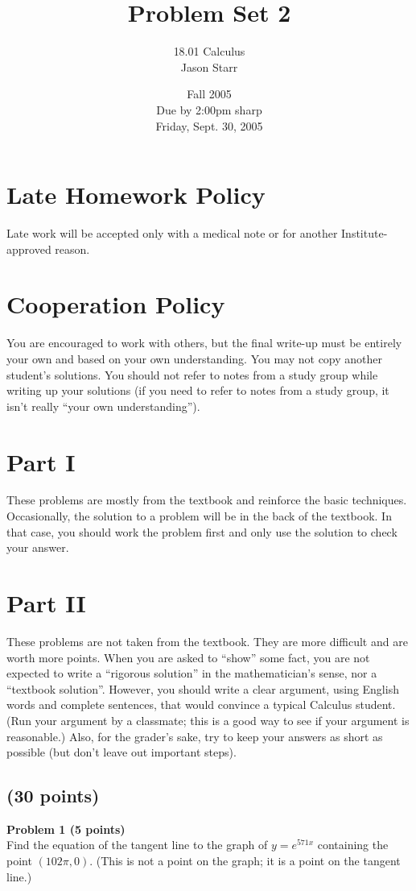 \documentclass{article}
\title{Problem Set 2}
\author{18.01 Calculus \\ Jason Starr}
\date{Fall 2005 \\ Due by 2:00pm sharp \\ Friday, Sept. 30, 2005}
\begin{document}
\maketitle

\section*{Late Homework Policy}
Late work will be accepted only with a medical note or for another Institute-approved reason.

\section*{Cooperation Policy}
You are encouraged to work with others, but the final write-up must be entirely your own and based on your own understanding. You may not copy another student’s solutions. You should not refer to notes from a study group while writing up your solutions (if you need to refer to notes from a study group, it isn’t really “your own understanding”).

\section*{Part I}
These problems are mostly from the textbook and reinforce the basic techniques. Occasionally, the solution to a problem will be in the back of the textbook. In that case, you should work the problem first and only use the solution to check your answer.

\section*{Part II}
These problems are not taken from the textbook. They are more difficult and are worth more points. When you are asked to “show” some fact, you are not expected to write a “rigorous solution” in the mathematician’s sense, nor a “textbook solution”. However, you should write a clear argument, using English words and complete sentences, that would convince a typical Calculus student. (Run your argument by a classmate; this is a good way to see if your argument is reasonable.) Also, for the grader’s sake, try to keep your answers as short as possible (but don’t leave out important steps).

\subsection*{(30 points)}
\textbf{Problem 1 (5 points)} \\
Find the equation of the tangent line to the graph of \( y = e^{571x} \) containing the point \( (102\pi, 0) \). (This is not a point on the graph; it is a point on the tangent line.)
\end{document}
